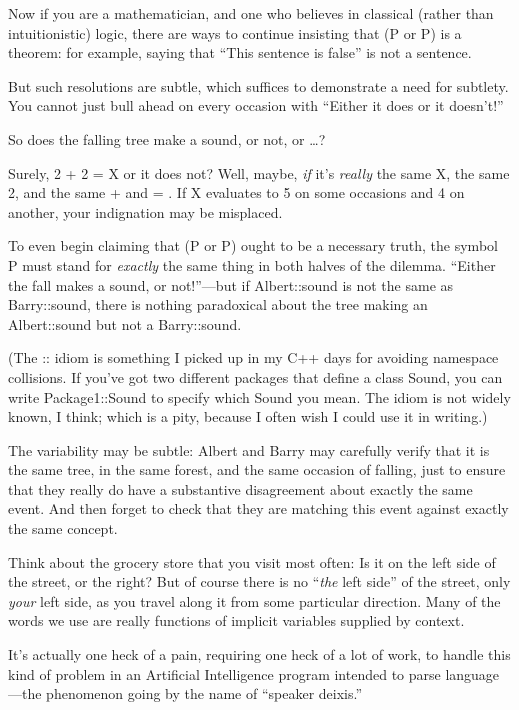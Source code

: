 {
 Now if you are a mathematician, and one who believes in classical
(rather than intuitionistic) logic, there are ways to continue
insisting that (P or {\textlnot}P) is a theorem: for example, saying
that ``This sentence is false'' is
not a sentence.}

{
 But such resolutions are subtle, which suffices to demonstrate a
need for subtlety. You cannot just bull ahead on every occasion with
``Either it does or it
doesn't!''}

{
 So does the falling tree make a sound, or not, or \ldots ?}

{
 Surely, 2 + 2 = X or it does not? Well, maybe, \textit{if}
it's \textit{really} the same X, the same 2, and the
same + and = . If X evaluates to 5 on some occasions and 4 on another,
your indignation may be misplaced.}

{
 To even begin claiming that (P or {\textlnot}P) ought to be a
necessary truth, the symbol P must stand for \textit{exactly} the same
thing in both halves of the dilemma. ``Either the fall
makes a sound, or not!''---but if Albert::sound is
not the same as Barry::sound, there is nothing paradoxical about the
tree making an Albert::sound but not a Barry::sound.}

{
 (The :: idiom is something I picked up in my C++ days for avoiding
namespace collisions. If you've got two different
packages that define a class Sound, you can write Package1::Sound to
specify which Sound you mean. The idiom is not widely known, I think;
which is a pity, because I often wish I could use it in writing.)}

{
 The variability may be subtle: Albert and Barry may carefully
verify that it is the same tree, in the same forest, and the same
occasion of falling, just to ensure that they really do have a
substantive disagreement about exactly the same event. And then forget
to check that they are matching this event against exactly the same
concept.}

{
 Think about the grocery store that you visit most often: Is it on
the left side of the street, or the right? But of course there is no
``\textit{the} left side'' of the
street, only \textit{your} left side, as you travel along it from some
particular direction. Many of the words we use are really functions of
implicit variables supplied by context.}

{
 It's actually one heck of a pain, requiring one
heck of a lot of work, to handle this kind of problem in an Artificial
Intelligence program intended to parse language---the phenomenon going
by the name of ``speaker deixis.''}

